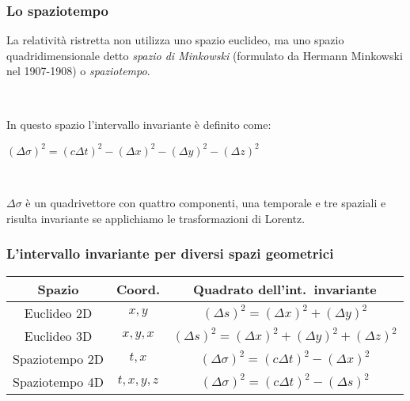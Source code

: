 \documentclass[]{beamer}
\theoremstyle{plain}
\begin{document}
\begin{frame}
\frametitle{Lo spaziotempo}
La relatività ristretta non utilizza uno spazio euclideo, ma uno spazio quadridimensionale detto \emph{spazio di Minkowski} (formulato da Hermann Minkowski nel 1907-1908) o \emph{spaziotempo}.\pause

~

In questo spazio l'intervallo invariante è definito come:
\begin{center}
\colorbox{blue!30}{$ (\Delta \sigma)^2  = (c\Delta t)^2 - (\Delta x )^2 - (\Delta y )^2 - (\Delta z )^2 $}
\end{center}\pause

~

$ \Delta \sigma $ è un quadrivettore con quattro componenti, una temporale e tre spaziali e risulta invariante se applichiamo le trasformazioni di Lorentz.

\end{frame}


\begin{frame}
\frametitle{L'intervallo invariante per diversi spazi geometrici}
\centering
  \begin{tabular}{c|c|c}
    \textbf{Spazio} & \textbf{Coord.} & \textbf{Quadrato dell'int.~invariante} \\\hline\rule{0pt}{3ex}
    Euclideo 2D & $ x,y $ & $ (\Delta s)^2  = (\Delta x )^2 + (\Delta y )^2 $ \\\rule{0pt}{6ex}
    Euclideo 3D & $ x,y,x $ & $ (\Delta s)^2  = (\Delta x )^2 + (\Delta y )^2 + (\Delta z )^2 $ \\\rule{0pt}{6ex}
    Spaziotempo 2D & $ t,x $ & $ (\Delta \sigma)^2  = (c\Delta t)^2 - (\Delta x )^2 $ \\\rule{0pt}{6ex}
    Spaziotempo 4D & $ t,x,y,z $ & $ (\Delta \sigma)^2  = (c\Delta t)^2 - (\Delta s )^2 $ \\
  \end{tabular}
\end{frame}
\end{document}
